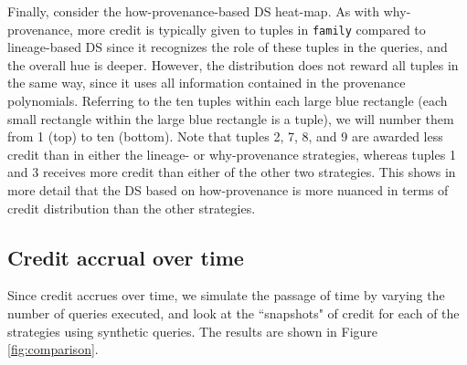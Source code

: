 Finally, consider the how-provenance-based DS heat-map. %
As with why-provenance, more credit is typically given to tuples in \texttt{family} compared to lineage-based DS since it recognizes the role of these tuples in the queries, and the overall hue is deeper.  However, the distribution does not reward all tuples in the same way, since it uses all information contained in the provenance polynomials.  Referring to the ten tuples within each large blue rectangle (each small rectangle within the large blue rectangle is a tuple), we will number them from 1 (top) to ten (bottom).  Note that tuples 2, 7, 8, and 9 are awarded less credit than in either the lineage- or why-provenance strategies, whereas tuples 1 and 3 receives more credit than either of the other two strategies. 
This shows in more detail that the DS based on how-provenance is more nuanced in terms of credit distribution than the other strategies. 


\subsection{Credit accrual over time} 
Since credit accrues over time, we simulate the passage of time by varying the number of queries executed, and look at the ``snapshots" of credit for each of the strategies using synthetic queries.  The results are shown in Figure \ref{fig:comparison}.

